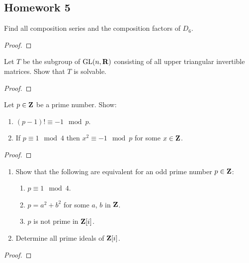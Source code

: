 \subsection{Homework 5}
\begin{problem}
Find all composition series and the composition factors of $D_6$.
\end{problem}
\begin{proof}
\end{proof}

\begin{problem}
Let $T$ be the subgroup of $\mathrm{GL}(n,\mathbf{R})$ consisting of all upper triangular
invertible matrices. Show that $T$ is solvable.
\end{problem}
\begin{proof}
\end{proof}

\begin{problem}
Let $p\in\mathbf{Z}$ be a prime number. Show:
\begin{enumerate}[label=(\alph*)]
\item $(p-1)!\equiv -1\mod{p}$.
\item If $p\equiv 1\mod{4}$ then $x^2\equiv -1\mod{p}$ for some
  $x\in\mathbf{Z}$.
\end{enumerate}
\end{problem}
\begin{proof}
\end{proof}

\begin{problem}
\begin{enumerate}[label=(\alph*)]
\item Show that the following are equivalent for an odd prime number
  $p\in\mathbf{Z}$:
  \begin{enumerate}[label=(\roman*)]
  \item $p\equiv 1\mod 4$.
  \item $p=a^2+b^2$ for some $a$, $b$ in $\mathbf{Z}$.
  \item $p$ is not prime in $\mathbf{Z}[i]$.
  \end{enumerate}
\item Determine all prime ideals of $\mathbf{Z}[i]$.
\end{enumerate}
\end{problem}
\begin{proof}
\end{proof}

